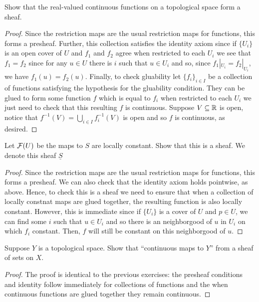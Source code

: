 \begin{exercise}
    Show that the real-valued continuous functions on a topological space form a sheaf. 
\end{exercise}

\begin{proof}
    Since the restriction maps are the usual restriction maps for functions, this forms a presheaf. Further, this collection satisfies the identity axiom since if $\{U_i\}$ is an open cover of $U$ and $f_1$ and $f_2$ agree when restricted to each $U_i$ we see that $f_1 = f_2$ since for any $u \in U$ there is $i$ such that $u \in U_i$ and so, since $f_1|_{U_i} = f_2|_{U_i}$, we have $f_1(u) = f_2(u)$. Finally, to check gluability let $\{f_i\}_{i \in I}$ be a collection of functions satisfying the hypothesis for the gluability condition. They can be glued to form some function $f$ which is equal to $f_i$ when restricted to each $U_i$ we just need to check that this resulting $f$ is continuous. Suppose $V \subseteq \mathbb{R}$ is open, notice that $f^{-1}(V) = \bigcup_{i \in I} f_i^{-1}(V)$ is open and so $f$ is continuous, as desired. 
\end{proof}

\begin{exercise}
    Let $\mathcal{F}(U)$ be the maps to $S$ are locally constant. Show that this is a sheaf. We denote this sheaf $\underline{S}$
\end{exercise}

\begin{proof}
    Since the restriction maps are the usual restriction maps for functions, this forms a presheaf. We can also check that the identity axiom holds pointwise, as above. Hence, to check this is a sheaf we need to ensure that when a collection of locally constnat maps are glued together, the resulting function is also locally constant. However, this is immediate since if $\{U_i\}$ is a cover of $U$ and $p \in U$, we can find some $i$ such that $u \in U_i$ and so there is an neighborgood of $u$ in $U_i$ on which $f_i$ constant. Then, $f$ will still be constant on this neighborgood of $u$.  
\end{proof}

\begin{exercise}
    Suppose $Y$ is a topological space. Show that ``continuous maps to $Y$'' from a sheaf of sets on $X$. 
\end{exercise}

\begin{proof}
    The proof is identical to the previous exercises: the presheaf conditions and identity follow immediately for collections of functions and the when continuous functions are glued together they remain continuous. 
\end{proof}

